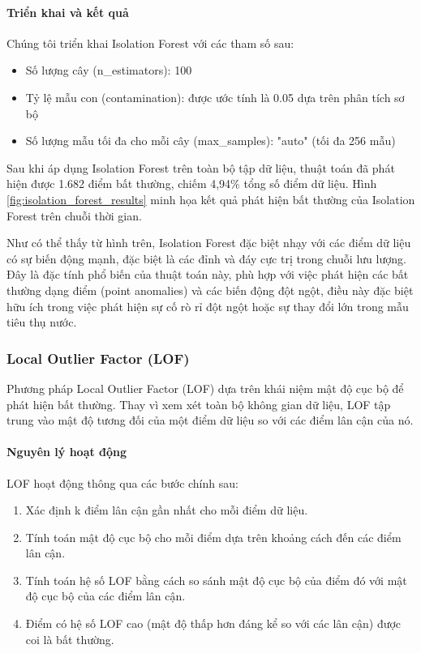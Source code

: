 \paragraph{Triển khai và kết quả}
Chúng tôi triển khai Isolation Forest với các tham số sau:
\begin{itemize}
    \item Số lượng cây (n\_estimators): 100
    \item Tỷ lệ mẫu con (contamination): được ước tính là 0.05 dựa trên phân tích sơ bộ
    \item Số lượng mẫu tối đa cho mỗi cây (max\_samples): "auto" (tối đa 256 mẫu)
\end{itemize}

Sau khi áp dụng Isolation Forest trên toàn bộ tập dữ liệu, thuật toán đã phát hiện được 1.682 điểm bất thường, chiếm 4,94\% tổng số điểm dữ liệu. Hình \ref{fig:isolation_forest_results} minh họa kết quả phát hiện bất thường của Isolation Forest trên chuỗi thời gian.


Như có thể thấy từ hình trên, Isolation Forest đặc biệt nhạy với các điểm dữ liệu có sự biến động mạnh, đặc biệt là các đỉnh và đáy cực trị trong chuỗi lưu lượng. Đây là đặc tính phổ biến của thuật toán này, phù hợp với việc phát hiện các bất thường dạng điểm (point anomalies) và các biến động đột ngột, điều này đặc biệt hữu ích trong việc phát hiện sự cố rò rỉ đột ngột hoặc sự thay đổi lớn trong mẫu tiêu thụ nước.

\subsubsection{Local Outlier Factor (LOF)}

Phương pháp Local Outlier Factor (LOF) dựa trên khái niệm mật độ cục bộ để phát hiện bất thường. Thay vì xem xét toàn bộ không gian dữ liệu, LOF tập trung vào mật độ tương đối của một điểm dữ liệu so với các điểm lân cận của nó.

\paragraph{Nguyên lý hoạt động}
LOF hoạt động thông qua các bước chính sau:
\begin{enumerate}
    \item Xác định k điểm lân cận gần nhất cho mỗi điểm dữ liệu.
    \item Tính toán mật độ cục bộ cho mỗi điểm dựa trên khoảng cách đến các điểm lân cận.
    \item Tính toán hệ số LOF bằng cách so sánh mật độ cục bộ của điểm đó với mật độ cục bộ của các điểm lân cận.
    \item Điểm có hệ số LOF cao (mật độ thấp hơn đáng kể so với các lân cận) được coi là bất thường.
\end{enumerate}

